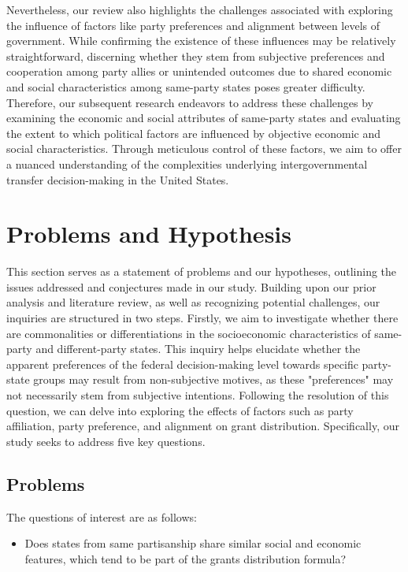 Nevertheless, our review also highlights the challenges associated with exploring the influence of factors like party preferences and alignment between levels of government. While confirming the existence of these influences may be relatively straightforward, discerning whether they stem from subjective preferences and cooperation among party allies or unintended outcomes due to shared economic and social characteristics among same-party states poses greater difficulty. Therefore, our subsequent research endeavors to address these challenges by examining the economic and social attributes of same-party states and evaluating the extent to which political factors are influenced by objective economic and social characteristics. Through meticulous control of these factors, we aim to offer a nuanced understanding of the complexities underlying intergovernmental transfer decision-making in the United States.


\section{Problems and Hypothesis}

This section serves as a statement of problems and our hypotheses, outlining the issues addressed and conjectures made in our study. Building upon our prior analysis and literature review, as well as recognizing potential challenges, our inquiries are structured in two steps. Firstly, we aim to investigate whether there are commonalities or differentiations in the socioeconomic characteristics of same-party and different-party states. This inquiry helps elucidate whether the apparent preferences of the federal decision-making level towards specific party-state groups may result from non-subjective motives, as these "preferences" may not necessarily stem from subjective intentions\parencite{martin2018dividing}. Following the resolution of this question, we can delve into exploring the effects of factors such as party affiliation, party preference, and alignment on grant distribution. Specifically, our study seeks to address five key questions.


\subsection{Problems}
The questions of interest are as follows:

\begin{itemize}
    \item  Does states from same partisanship share similar social and economic features, which tend to be part of the grants distribution formula?
\end{itemize}

